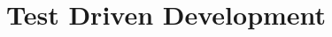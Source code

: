\documentclass[11pt,a4paper,twoside,openany]{book}
\begin{document}

\chapter{Test Driven Development}







\end{document}
